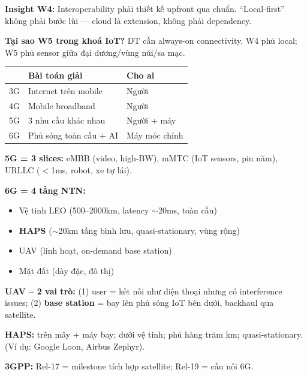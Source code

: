 \documentclass[9pt,a4paper,twocolumn]{article}
\begin{document}
\begin{tcolorbox}[insightbox]
\scriptsize \textbf{Insight W4:} Interoperability phải thiết kế upfront qua chuẩn.
``Local-first'' không phải bước lùi --- cloud là extension, không phải dependency.
\end{tcolorbox}

\begin{tcolorbox}[weekbox, title={W5 --- 6G \& Non-Terrestrial Networks (NTN)}]

\textbf{Tại sao W5 trong khoá IoT?} DT cần always-on connectivity.
W4 phủ local; W5 phủ sensor giữa đại dương/vùng núi/sa mạc.

\begin{tabular}{@{}p{0.8cm}p{2.0cm}p{2.6cm}@{}}
\toprule
\scriptsize & \scriptsize Bài toán giải & \scriptsize Cho ai \\
\midrule
\scriptsize 3G & \scriptsize Internet trên mobile & \scriptsize Người \\
\scriptsize 4G & \scriptsize Mobile broadband & \scriptsize Người \\
\scriptsize 5G & \scriptsize 3 nhu cầu khác nhau & \scriptsize Người + máy \\
\scriptsize 6G & \scriptsize Phủ sóng toàn cầu + AI & \scriptsize Máy móc chính \\
\bottomrule
\end{tabular}

\vspace{3pt}
\textbf{5G = 3 slices:} eMBB (video, high-BW), mMTC (IoT sensors, pin năm),
URLLC ($<$1ms, robot, xe tự lái).

\textbf{6G = 4 tầng NTN:}
\begin{itemize}
  \item Vệ tinh LEO (500--2000km, latency $\sim$20ms, toàn cầu)
  \item \textbf{HAPS} ($\sim$20km tầng bình lưu, quasi-stationary, vùng rộng)
  \item UAV (linh hoạt, on-demand base station)
  \item Mặt đất (dày đặc, đô thị)
\end{itemize}

\textbf{UAV -- 2 vai trò:} (1) user = kết nối như điện thoại nhưng có interference issues;
(2) \textbf{base station} = bay lên phủ sóng IoT bên dưới, backhaul qua satellite.

\textbf{HAPS:} trên mây + máy bay; dưới vệ tinh; phủ hàng trăm km; quasi-stationary.
(Ví dụ: Google Loon, Airbus Zephyr).

\textbf{3GPP:} Rel-17 = milestone tích hợp satellite; Rel-19 = cầu nối 6G.

\end{tcolorbox}
\end{document}
